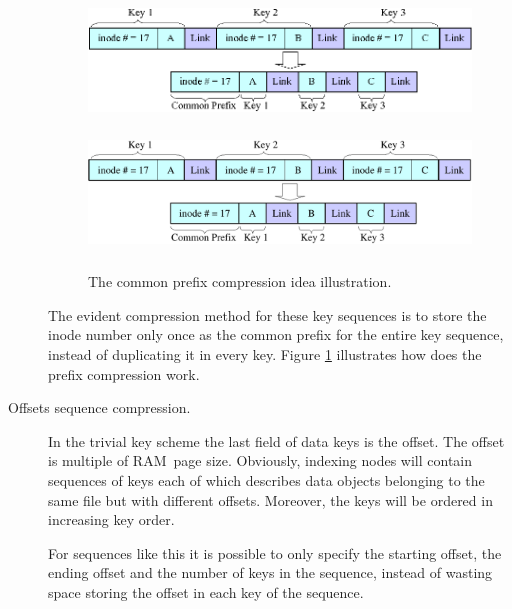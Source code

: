\begin{description}
%
%
\begin{figure}[h]
\begin{center}
\begin{htmlonly}
\includegraphics{pics/comprex-01.png}
\end{htmlonly}
\includegraphics[width=160mm,height=40mm]{pics/comprex-01.pdf}
\end{center}
\caption{The common prefix compression idea illustration.}
\label{ref_FigureKeyComprEx_01}
\end{figure}

The evident compression method for these key sequences is to store the inode
number only once as the common prefix for the entire key sequence, instead of
duplicating it in every key. Figure \ref{ref_FigureKeyComprEx_01} illustrates
how does the prefix compression work.

\item[Offsets sequence compression.] In the trivial key scheme the last field
of data keys is the offset. The offset is multiple of RAM~page size. Obviously,
indexing nodes will contain sequences of keys each of which describes data
objects belonging to the same file but with different offsets. Moreover, the
keys will be ordered in increasing key order. 

For sequences like this it is possible to only specify the starting offset, the
ending offset and the number of keys in the sequence, instead of wasting space
storing the offset in each key of the sequence.


\end{description}

